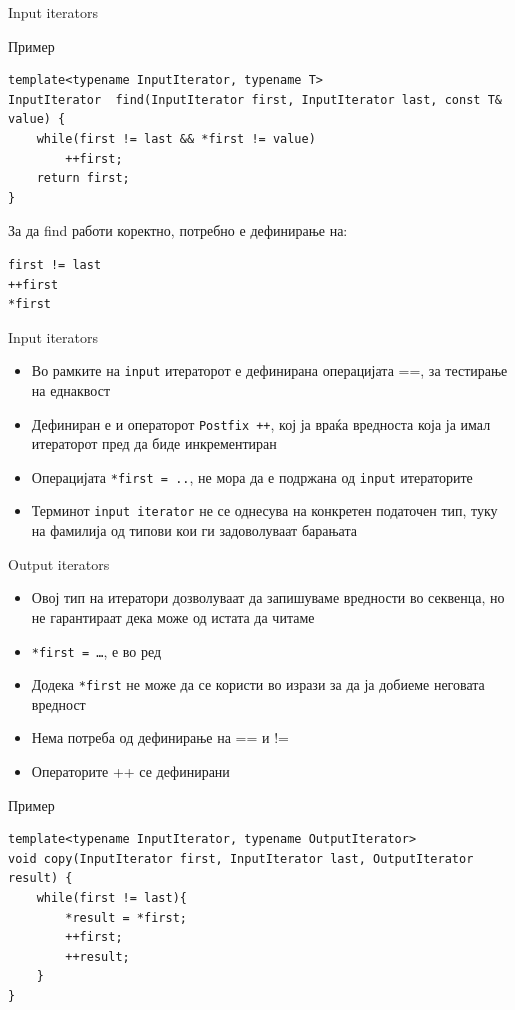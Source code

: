 \begin{frame}[fragile]{Input iterators}
\begin{block}{Пример}
\begin{lstlisting}
template<typename InputIterator, typename T>
InputIterator  find(InputIterator first, InputIterator last, const T& value) {
    while(first != last && *first != value)
        ++first;
    return first;
}
\end{lstlisting}
\end{block}
За да find работи коректно, потребно е дефинирање на:
\begin{lstlisting}
first != last
++first
*first
\end{lstlisting}
\end{frame}

\begin{frame}{Input iterators}
\begin{itemize}
  \item Во рамките на \texttt{input} итераторот е дефинирана операцијата ==, за
  тестирање на еднаквост
  \item Дефиниран е и операторот \texttt{Postfix ++}, кој ја враќа вредноста која ја имал
  итераторот пред да биде инкрементиран
  \item Операцијата \texttt{*first = ..}, не мора да е подржана од
  \texttt{input} итераторите
  \item Терминот \texttt{input iterator} не се однесува на конкретен податочен тип, туку
  на фамилија од типови кои ги задоволуваат барањата
\end{itemize}
\end{frame}

\begin{frame}[fragile]{Output iterators}
\begin{itemize}
  \item Овој тип на итератори дозволуваат да запишуваме вредности во секвенца,
  но не гарантираат дека може од истата да читаме
  \item \texttt{*first = \ldots}, е во ред
  \item Додека \texttt{*first} не може да се користи во изрази за да ја добиеме неговата
  вредност
  \item Нема потреба од дефинирање на == и !=
  \item Операторите ++ се дефинирани
\end{itemize} 

\begin{block}{Пример}
\begin{lstlisting}
template<typename InputIterator, typename OutputIterator>
void copy(InputIterator first, InputIterator last, OutputIterator result) {
    while(first != last){
        *result = *first;
        ++first;
        ++result;
    }
}
\end{lstlisting}
\end{block}
\end{frame}

